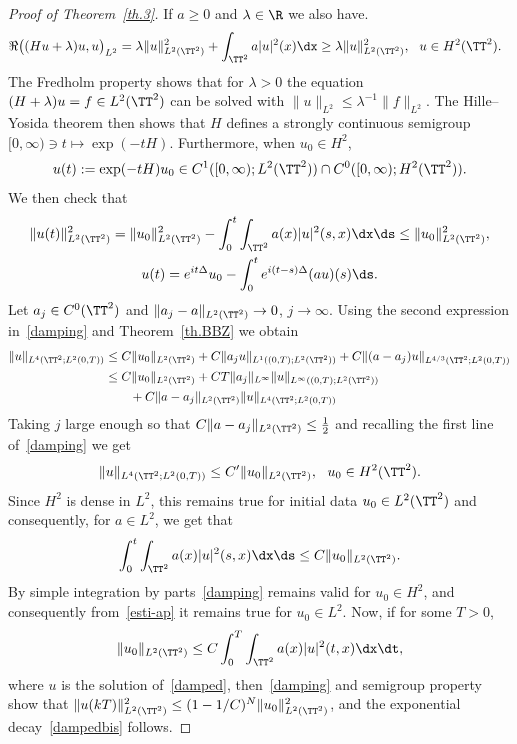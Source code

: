 \begin{proof}[Proof of Theorem~\ref{th.3}]
If $ a \geq 0 $ and $ \lambda \in \R $ we also have.
\[
\Re \bigl((Hu + \lambda) u, u \bigr)_{L^2} =
\lambda \| u \|_{L^2(\TT^2)} ^2 +
\int_{\TT^2} a |u|^2 (x) \dx \geq \lambda \| u \|_{L^2(\TT^2)} ^2, \ \ u \in H^2 (\TT^2).\ \
\]
The Fredholm property shows that for $\lambda >0$ the equation $(H + \lambda) u =f \in L^2(\TT^2)$ can be solved with $ \| u \|_{ L^2 } \leq \lambda^{-1} \| f \|_{L^2 } $. The Hille--Yosida theorem then shows that $ H $ defines a strongly continuous semigroup $ [0, \infty) \ni t \mapsto \exp (- t H) $. Furthermore, when $u_0 \in H^2$,
\[
u(t) := \exp (- t H) u_0 \in C^1([0, \infty) ; L^2(\TT^2))\cap C^0([0, \infty) ; H^2(\TT^2)).
\]
We then check that
\begin{equation}\label{damping}
\begin{gathered}
\| u(t) \|^2_{L^2(\TT^2)} = \| u_0 \|^2_{L^2(\TT^2)}- \int_0 ^t \int_{\TT^2} a(x) |u|^2(s,x) \dx \ds \leq \| u_0 \|^2_{L^2(\TT^2)},\\
u(t) = e^{it \Delta} u_0 - \int_0^t e^{i(t-s)\Delta} (au)(s) \ds.
\end{gathered}
\end{equation}
Let $a_j \in C^0 (\TT^2) $ and $ \| a_j - a\|_{L^2 (\TT^2) } \to 0 $, $ j \to \infty $. Using the second expression in~\eqref{damping} and Theorem~\ref{th.BBZ} we obtain
\[
\begin{split}
\| u\|_{L^4(\TT^2; L^2(0,T))} & \leq C \| u_0 \|_{L^2(\TT^2)} + C\| a_j u \|_{L^1((0,T); L^2(\TT^2))} + C\| (a- a_j)u \|_{L^{4/3}(\TT^2; L^2(0,T))}\\
& \leq C \| u_0 \|_{L^2(\TT^2)} +C T\| a_j\|_{L^\infty} \| u\|_{L^{\infty}((0,T); L^2(\TT^2))}
\\ & \qquad +C\| a-a_j\|_{L^2(\TT^2)} \| u \|_{L^{4}(\TT^2; L^2(0,T))}
\end{split}
\]
Taking $ j$ large enough so that $C\| a-a_j\|_{L^2(\TT^2)} \leq \frac12$ and recalling the first line of~\eqref{damping} we get
\[
\| u\|_{L^4(\TT^2; L^2(0,T))} \leq C' \| u_0 \|_{L^2(\TT^2)}, \ \
u_0 \in H^2 (\TT^2).
\]
Since $ H^2 $ is dense in $L ^2 $, this remains true for initial data $u_0\in L^2(\TT^2)$ and consequently, for $ a \in L^2 $, we get that
\begin{equation}\label{esti-ap}
\int_0 ^t \int_{\TT^2} a(x) |u|^2(s,x) \dx \ds\leq C \| u_0 \|_{L^2(\TT^2)}.
\end{equation}
By simple integration by parts~\eqref{damping} remains valid for $u_0\in H^2$, and consequently from~\eqref{esti-ap} it remains true for $u_0\in L^2$. Now, if for some $ T > 0 $,
\begin{equation}\label{eq:u00}
\| u_0 \|_{L^2(\TT^2)} \leq C \int_0 ^T \int_{\TT^2} a(x) |u|^2(t,x) \dx \dt,
\end{equation}
where $u$ is the solution of~\eqref{damped}, then~\eqref{damping} and semigroup property show that $ \| u (k T) \|_{ L^2 (\TT^2)}^2 \leq (1 - 1/C)^N \| u_0 \|_{ L^2 (\TT^2) }^2$, and the exponential decay~\eqref{dampedbis} follows.


\end{proof}
